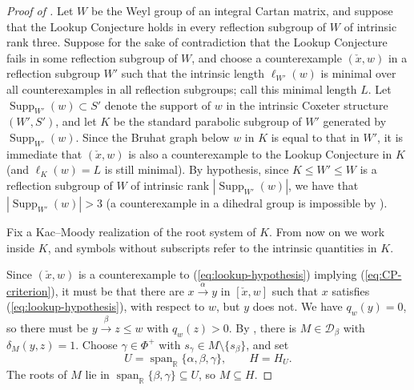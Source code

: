 \documentclass[11pt]{amsart}
\theoremstyle{definition}
\theoremstyle{remark}
\numberwithin{equation}{section}
\newcommand{\R}{\mathbb R}
\DeclareMathOperator{\Span}{span}
\DeclareMathOperator{\supp}{Supp}
\begin{document}
\begin{proof}[Proof of ]
Let $W$ be the Weyl group of an integral Cartan matrix, and suppose that the Lookup Conjecture holds in every reflection subgroup of $W$ of intrinsic rank three. Suppose for the sake of contradiction that the Lookup Conjecture fails in some reflection subgroup of $W$, and choose a counterexample $(\check{x},w)$ in a reflection subgroup $W'$ such that the intrinsic length $\ell_{W'}(w)$ is minimal over all counterexamples in all reflection subgroups; call this minimal length $L$. Let $\supp_{W'}(w) \subset S'$ denote the support of $w$ in the intrinsic Coxeter structure $(W',S')$, and let $K$ be the standard parabolic subgroup of $W'$ generated by $\supp_{W'}(w)$. Since the Bruhat graph below $w$ in $K$ is equal to that in $W'$, it is immediate that $(\check{x},w)$ is also a counterexample to the Lookup Conjecture in $K$ (and $\ell_K(w)=L$ is still minimal). By hypothesis, since $K \leq W' \leq W$ is a reflection subgroup of $W$ of intrinsic rank $|\supp_{W'}(w)|$, we have that $|\supp_{W'}(w)|>3$ (a counterexample in a dihedral group is impossible by ).

Fix a Kac--Moody realization of the root system of $K$. From now on we work inside $K$, and symbols without subscripts refer to the intrinsic quantities in $K$.

Since $(\check{x},w)$ is a counterexample to (\ref{eq:lookup-hypothesis}) implying (\ref{eq:CP-criterion}), it must be that there are $x \xrightarrow{\alpha} y$ in $[\check{x},w]$ such that $x$ satisfies (\ref{eq:lookup-hypothesis}), with respect to $w$, but $y$ does not. We have $q_w(y)=0$, so there must be $y\xrightarrow{\beta} z\le w$ with $q_w(z)>0$.  By , there is $M \in \mathcal{D}_\beta$ with
$\delta_M(y,z)=1$. Choose $\gamma\in\Phi^+$ with
$s_\gamma\in M\setminus\{s_\beta\}$, and set
\[
 U=\Span_\R\{\alpha,\beta,\gamma\},\qquad H=H_U.
\]
The roots of $M$ lie in
$\Span_\R\{\beta,\gamma\}\subseteq U$, so $M\subseteq H$.


\end{proof}
\end{document}
